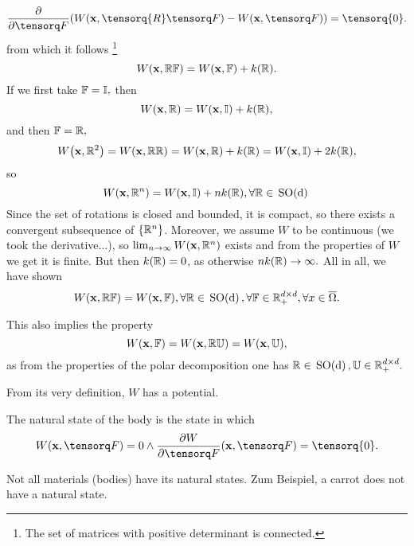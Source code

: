 \documentclass[11pt]{scrartcl} %
\begin{document}
\[
	\pdv{\fgrad}\qty(W\qty(\vb{x},\tensorq{R}\fgrad)-W\qty(\vb{x},\fgrad)) = \tensorq{0}.
\]
from which it follows \footnote{The set of matrices with positive determinant is connected.}
\[
	W\qty(\vb{x},\mathbb{R} \mathbb{F}) = W\qty(\vb{x},\mathbb{F}) + k\qty(\mathbb{R}).
\]
If we first take $\mathbb{F} = \mathbb{I},$ then
\[
	W\qty(\vb{x}, \mathbb{R}) = W\qty(\vb{x}, \mathbb{I}) + k\qty(\mathbb{R}),
\]
and then $\mathbb{F} = \mathbb{R},$
\[
	W\qty(\vb{x}, \mathbb{R}^{2}) = W\qty(\vb{x},\mathbb{R}\mathbb{R}) = W\qty(\vb{x},\mathbb{R})+k\qty(\mathbb{R}) = W\qty(\vb{x},\mathbb{I})+2 k\qty(\mathbb{R}),
\]
 so
\[
	W\qty(\vb{x},\mathbb{R}^n)=W\qty(\vb{x},\mathbb{I})+nk\qty(\mathbb{R}), \forall \mathbb{R} \in \, \text{SO(d)} \,
\]
Since the set of rotations is closed and bounded, it is compact, so there exists a convergent subsequence of $\{\mathbb{R}^n\}$. Moreover, we assume $W$ to be continuous (we took the derivative...), so $\lim_{n \to \infty}W\qty(\vb{x},\mathbb{R}^n)$ exists and from the properties of $W$ we get it is finite. But then $k\qty(\mathbb{R}) = 0$, as otherwise $nk\qty(\mathbb{R})\to \infty.$ All in all, we have shown
\begin{equation}
    W\qty(\vb{x}, \mathbb{R}\mathbb{F}) = W\qty(\vb{x},\mathbb{F}), \forall \mathbb{R} \in \, \text{SO(d)} \,, \forall \mathbb{F} \in {\mathbb R}^{d \times d}_+, \forall x \in \overline{\Omega}.
\end{equation}

This also implies the property
\[
	W\qty(\vb{x}, \mathbb{F}) = W\qty(\vb{x}, \mathbb{R} \mathbb{U}) = W\qty(\vb{x}, \mathbb{U}),
\]
as from the properties of the polar decomposition one has $\mathbb{R} \in \, \text{SO(d)} \,, \mathbb{U} \in {\mathbb R}^{d \times d}_+.$
	
\begin{remark}
    From its very definition, $W$ has a potential. 
\end{remark}

\begin{definition}
    The natural state of the body is the state in which
    \begin{equation}
	    \label{eq:natural}
	    W(\vb{x},\fgrad) = 0 \wedge \pdv{W}{\fgrad}\qty(\vb{x},\fgrad) = \tensorq{0}.
    \end{equation}
\end{definition}

\begin{remark}
    Not all materials (bodies) have its natural states. Zum Beispiel, a carrot does not have a natural state.
\end{remark}
\end{document}

